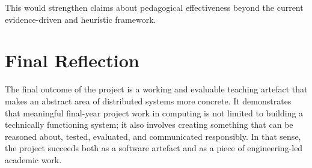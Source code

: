 This would strengthen claims about pedagogical effectiveness beyond the current evidence-driven and heuristic framework.

\section{Final Reflection}
The final outcome of the project is a working and evaluable teaching artefact that makes an abstract area of distributed systems more concrete. It demonstrates that meaningful final-year project work in computing is not limited to building a technically functioning system; it also involves creating something that can be reasoned about, tested, evaluated, and communicated responsibly. In that sense, the project succeeds both as a software artefact and as a piece of engineering-led academic work.